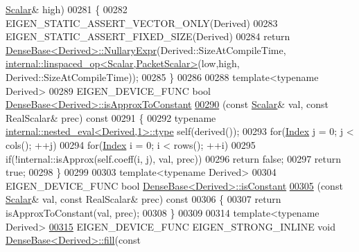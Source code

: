 \begin{DoxyCode}
      \hyperlink{group___core___module_a5feed465b3a8e60c47e73ecce83e39a2}{Scalar}& high)
00281 \{
00282   EIGEN\_STATIC\_ASSERT\_VECTOR\_ONLY(Derived)
00283   EIGEN\_STATIC\_ASSERT\_FIXED\_SIZE(Derived)
00284   \textcolor{keywordflow}{return} \hyperlink{group___core___module_class_eigen_1_1_dense_base}{DenseBase<Derived>::NullaryExpr}(Derived::SizeAtCompileTime, 
      \hyperlink{struct_eigen_1_1internal_1_1linspaced__op}{internal::linspaced\_op<Scalar,PacketScalar>}(low,high,
      Derived::SizeAtCompileTime));
00285 \}
00286 
00288 \textcolor{keyword}{template}<\textcolor{keyword}{typename} Derived>
00289 EIGEN\_DEVICE\_FUNC \textcolor{keywordtype}{bool} \hyperlink{group___core___module_aafb86c9868d3d9076e01e4fc54c93e81}{DenseBase<Derived>::isApproxToConstant}
\hyperlink{group___core___module_aafb86c9868d3d9076e01e4fc54c93e81}{00290} (\textcolor{keyword}{const} \hyperlink{group___core___module_a5feed465b3a8e60c47e73ecce83e39a2}{Scalar}& val, \textcolor{keyword}{const} RealScalar& prec) \textcolor{keyword}{const}
00291 \{
00292   \textcolor{keyword}{typename} \hyperlink{class_eigen_1_1internal_1_1_tensor_lazy_evaluator_writable}{internal::nested\_eval<Derived,1>::type} \textcolor{keyword}{self}(derived());
00293   \textcolor{keywordflow}{for}(\hyperlink{namespace_eigen_a62e77e0933482dafde8fe197d9a2cfde}{Index} j = 0; j < cols(); ++j)
00294     \textcolor{keywordflow}{for}(\hyperlink{namespace_eigen_a62e77e0933482dafde8fe197d9a2cfde}{Index} i = 0; i < rows(); ++i)
00295       \textcolor{keywordflow}{if}(!internal::isApprox(\textcolor{keyword}{self}.coeff(i, j), val, prec))
00296         \textcolor{keywordflow}{return} \textcolor{keyword}{false};
00297   \textcolor{keywordflow}{return} \textcolor{keyword}{true};
00298 \}
00299 
00303 \textcolor{keyword}{template}<\textcolor{keyword}{typename} Derived>
00304 EIGEN\_DEVICE\_FUNC \textcolor{keywordtype}{bool} \hyperlink{group___core___module_aba0e5df04cf80214d8298aa8dd41acbd}{DenseBase<Derived>::isConstant}
\hyperlink{group___core___module_aba0e5df04cf80214d8298aa8dd41acbd}{00305} (\textcolor{keyword}{const} \hyperlink{group___core___module_a5feed465b3a8e60c47e73ecce83e39a2}{Scalar}& val, \textcolor{keyword}{const} RealScalar& prec) \textcolor{keyword}{const}
00306 \{
00307   \textcolor{keywordflow}{return} isApproxToConstant(val, prec);
00308 \}
00309 
00314 \textcolor{keyword}{template}<\textcolor{keyword}{typename} Derived>
\hyperlink{group___core___module_a4f5eb49e80db57f79a8353ecdf811418}{00315} EIGEN\_DEVICE\_FUNC EIGEN\_STRONG\_INLINE \textcolor{keywordtype}{void} \hyperlink{group___core___module_a4f5eb49e80db57f79a8353ecdf811418}{DenseBase<Derived>::fill}(\textcolor{keyword}{const} 

\end{DoxyCode}
